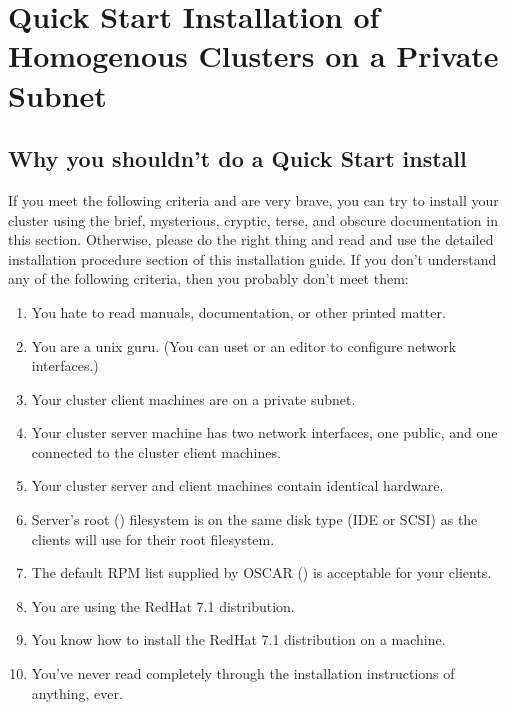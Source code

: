 %
%
%

\begchange
\section{Quick Start Installation of Homogenous Clusters on a Private Subnet}


\subsection{Why you shouldn't do a Quick Start install}

If you meet the following criteria and are very brave, you can 
try to install your cluster using the brief, mysterious,
cryptic, terse, and obscure documentation in this section.  
Otherwise, please do the right thing and read and use the 
detailed installation procedure section of this installation guide.
If you don't understand any of the following criteria, 
then you probably don't meet them:

\begin{enumerate}
\item You hate to read manuals, documentation, or other printed matter.
\item You are a unix guru. (You can uset  or an editor to
  configure network interfaces.)
\item Your cluster client machines are on a private subnet.
\item Your cluster server machine has two network interfaces, one public,
  and one connected to the cluster client machines.
\item Your cluster server and client machines contain identical hardware.
\item Server's root (\file{/}) filesystem is on the same disk type (IDE
  or SCSI) as the clients will use for their root filesystem.
\item The default RPM list supplied by OSCAR
  () is
  acceptable for your clients.
\item You are using the RedHat 7.1 distribution.
\item You know how to install the RedHat 7.1 distribution on a machine.
\item You've never read completely through the installation instructions
  of anything, ever. 
\end{enumerate}

